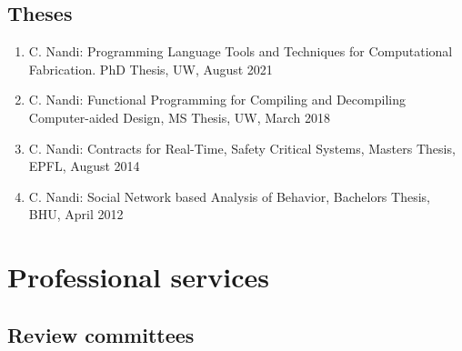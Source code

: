 \documentclass[margin, 10pt]{res} %
\begin{document}
\begin{resume}
\subsection{Theses}
\begin{enumerate}
\item C. Nandi: Programming Language Tools and Techniques for Computational Fabrication. {PhD Thesis}, UW, August 2021
\item C. Nandi: Functional Programming for Compiling and Decompiling Computer-aided Design, {MS Thesis}, UW, March 2018
\item C. Nandi: Contracts for Real-Time, Safety Critical Systems, {Masters Thesis}, EPFL, August 2014
\item C. Nandi: Social Network based Analysis of Behavior, {Bachelors Thesis}, BHU, April 2012
\end{enumerate}

\section{Professional services}


\subsection{Review committees}


\end{resume}
\end{document}
